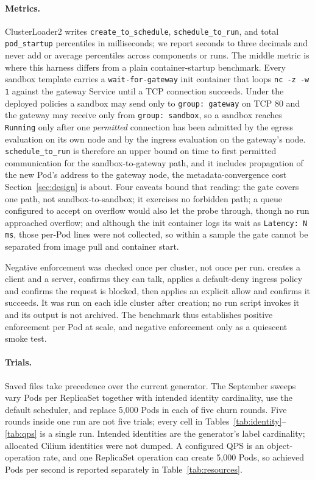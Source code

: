 \paragraph{Metrics.}
ClusterLoader2 writes \texttt{create\_to\_schedule},
\texttt{schedule\_to\_run}, and total \texttt{pod\_startup} percentiles
in milliseconds; we report seconds to three decimals and never add or
average percentiles across components or runs. The middle metric is
where this harness differs from a plain container-startup benchmark.
Every sandbox template carries a \texttt{wait-for-gateway} init container
that loops \texttt{nc -z -w 1} against the gateway Service until a TCP
connection succeeds. Under the deployed policies a sandbox may send only
to \texttt{group: gateway} on TCP 80 and the gateway may receive only
from \texttt{group: sandbox}, so a sandbox reaches \texttt{Running} only
after one \emph{permitted} connection has been admitted by the egress
evaluation on its own node and by the ingress evaluation on the gateway's
node. \texttt{schedule\_to\_run} is therefore an upper bound on time to
first permitted communication for the sandbox-to-gateway path, and it
includes propagation of the new Pod's address to the gateway node, the
metadata-convergence cost Section~\ref{sec:design} is about. Four caveats
bound that reading: the gate covers one path, not sandbox-to-sandbox; it
exercises no forbidden path; a queue configured to accept on overflow
would also let the probe through, though no run approached overflow; and
although the init container
logs its wait as \texttt{Latency: N ms}, those per-Pod lines were not
collected, so within a sample the gate cannot be separated from image
pull and container start.

Negative enforcement was checked once per cluster, not once per run.
 creates a client and a server, confirms
they can talk, applies a default-deny ingress policy and confirms the
request is blocked, then applies an explicit allow and confirms it
succeeds. It was run on each idle cluster after creation; no run script
invokes it and its output is not archived. The benchmark thus
establishes positive enforcement per Pod at scale, and negative
enforcement only as a quiescent smoke test.

\paragraph{Trials.}
Saved  files take precedence over the
current generator. The September sweeps vary Pods per ReplicaSet
together with intended identity cardinality, use the default scheduler,
and replace 5,000 Pods in each of five churn rounds. Five rounds inside
one run are not five trials; every cell in
Tables~\ref{tab:identity}--\ref{tab:qps} is a single run. Intended
identities are the generator's label cardinality; allocated Cilium
identities were not dumped. A configured QPS is an object-operation
rate, and one ReplicaSet operation can create 5,000 Pods, so achieved
Pods per second is reported separately in Table~\ref{tab:resources}.

